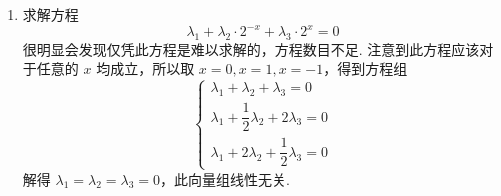 \documentclass[UTF8,12pt,a4paper,fontset=fandol]{ctexart}
\begin{document}
\begin{solve}
\begin{enumerate}
        \item 求解方程
              \[\lambda_1 + \lambda_2·2^{-x} + \lambda_3·2^x = 0\]
              很明显会发现仅凭此方程是难以求解的，方程数目不足. 注意到此方程应该对于任意的 $x$ 均成立，所以取 $x = 0, x = 1, x = -1$，得到方程组
              \[ \begin{cases}
                      \lambda_1 + \lambda_2 + \lambda_3 = 0              \\[1ex]
                      \lambda_1 + \dfrac{1}{2}\lambda_2 + 2\lambda_3 = 0 \\[1ex]
                      \lambda_1 + 2\lambda_2 + \dfrac{1}{2}\lambda_3 = 0
                  \end{cases} \]
              解得 $\lambda_1 = \lambda_2 = \lambda_3 = 0$，此向量组线性无关.
    \end{enumerate}
\end{solve}
\end{document}
